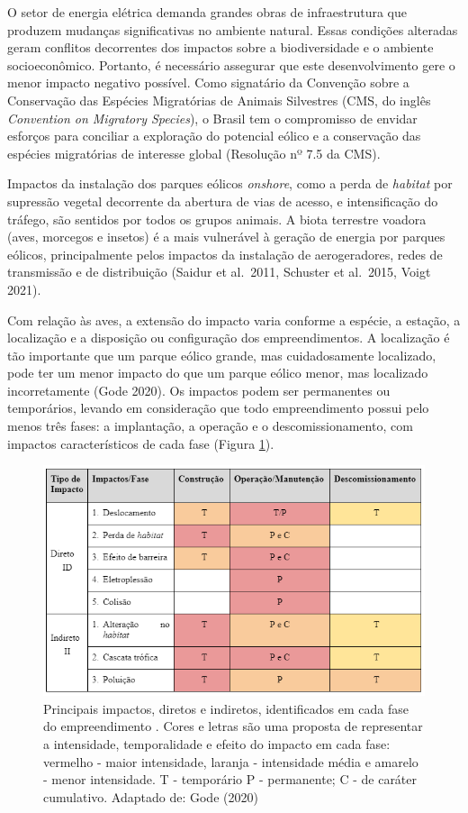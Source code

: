 \documentclass[
  oneside]{scrbook}
\begin{document}
O setor de energia elétrica demanda grandes obras de infraestrutura que produzem mudanças significativas no ambiente natural. Essas condições alteradas geram conflitos decorrentes dos impactos sobre a biodiversidade e o ambiente socioeconômico. Portanto, é necessário assegurar que este desenvolvimento gere o menor impacto negativo possível. Como signatário da Convenção sobre a Conservação das Espécies Migratórias de Animais Silvestres (CMS, do inglês \emph{Convention on Migratory Species}), o Brasil tem o compromisso de envidar esforços para conciliar a exploração do potencial eólico e a conservação das espécies migratórias de interesse global (Resolução nº 7.5 da CMS).

Impactos da instalação dos parques eólicos \emph{onshore}, como a perda de \emph{habitat} por supressão vegetal decorrente da abertura de vias de acesso, e intensificação do tráfego, são sentidos por todos os grupos animais. A biota terrestre voadora (aves, morcegos e insetos) é a mais vulnerável à geração de energia por parques eólicos, principalmente pelos impactos da instalação de aerogeradores, redes de transmissão e de distribuição (Saidur et al.~2011, Schuster et al.~2015, Voigt 2021).

Com relação às aves, a extensão do impacto varia conforme a espécie, a estação, a localização e a disposição ou configuração dos empreendimentos. A localização é tão importante que um parque eólico grande, mas cuidadosamente localizado, pode ter um menor impacto do que um parque eólico menor, mas localizado incorretamente (Gode 2020). Os impactos podem ser permanentes ou temporários, levando em consideração que todo empreendimento possui pelo menos três fases: a implantação, a operação e o descomissionamento, com impactos característicos de cada fase (Figura \ref{fig:12}).

\begin{figure}[H]

{\centering \includegraphics[width=0.75\linewidth]{imagens/cap04/Figura_4.1} 

}

\caption{Principais impactos, diretos e indiretos, identificados em cada fase do empreendimento . Cores e letras são uma proposta de representar a intensidade, temporalidade e efeito do impacto em cada fase: vermelho - maior intensidade, laranja - intensidade média e amarelo - menor intensidade. T - temporário P  -  permanente; C - de caráter cumulativo. Adaptado de: Gode (2020)}\label{fig:12}
\end{figure}
\end{document}
